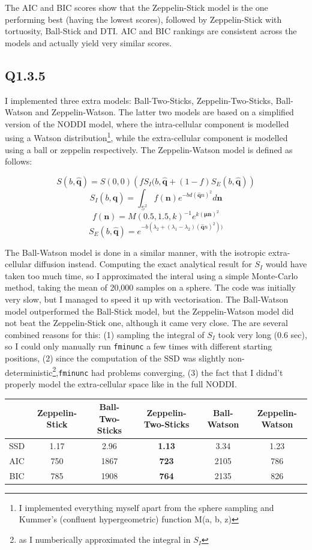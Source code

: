\documentclass[11pt,a4paper,oneside]{report}
\begin{document}
The AIC and BIC scores show that the Zeppelin-Stick model is the one performing best (having the lowest scores), followed by Zeppelin-Stick with tortuosity, Ball-Stick and DTI. AIC and BIC rankings are consistent across the models and actually yield very similar scores.


\subsection*{Q1.3.5}

I implemented three extra models: Ball-Two-Sticks, Zeppelin-Two-Sticks, Ball-Watson and Zeppelin-Watson. The latter two models are based on a simplified version of the NODDI model, where the intra-cellular component is modelled using a Watson distribution\footnote{I implemented everything myself apart from the sphere sampling and Kummer's (confluent hypergeometric) function M(a, b, z)}, while the extra-cellular component is modelled using a ball or zeppelin respectively. The Zeppelin-Watson model is defined as follows:

$$ S(b, \hat{\textbf{q}}) = S(0,0)\left(fS_I(b,\hat{\textbf{q}} + (1-f)S_E(b,\hat{\textbf{q}})\right)$$
$$S_I(b,\hat{\textbf{q}}) = \int_{\mathbb{S}^2}f(\textbf{n})e^{-bd(\hat{\textbf{q}} n)^2}d\textbf{n}$$
$$ f(\textbf{n}) = M(0.5, 1.5, k)^{-1} e^{k(\boldsymbol{\mu}\textbf{n})^2}$$
$$S_E(b,\hat{\textbf{q}}) = e^{-b(\lambda_2 + (\lambda_1 - \lambda_2)(\hat{\textbf{q}} n)^2))}$$

The Ball-Watson model is done in a similar manner, with the isotropic extra-cellular diffusion instead. Computing the exact analytical result for $S_I$ would have taken too much time, so I approximated the interal using a simple Monte-Carlo method, taking the mean of 20,000 samples on a sphere. The code was initially very slow, but I managed to speed it up with vectorisation. The Ball-Watson model outperformed the Ball-Stick model, but the Zeppelin-Watson model did not beat the Zeppelin-Stick one, although it came very close. The are several combined reasons for this: (1) sampling the integral of $S_I$ took very long (0.6 sec), so I could only manually run \texttt{fminunc} a few times with different starting positions, (2) since the computation of the SSD was slightly non-deterministic\footnote{as I numberically approximated the integral in $S_I$},\texttt{fminunc} had problems converging, (3) the fact that I didnd't properly model the extra-cellular space like in the full NODDI.

\begin{center}
 \begin{tabular}{c | c c c c c}
   & Zeppelin-Stick &  Ball-Two-Sticks & \textbf{Zeppelin-Two-Sticks} & Ball-Watson & Zeppelin-Watson\\
  \hline
  SSD & 1.17 & 2.96 & \textbf{1.13} & 3.34 & 1.23\\
  AIC & 750 & 1867 &  \textbf{723} & 2105 & 786\\
  BIC & 785 & 1908 &  \textbf{764} & 2135 & 826\\
  
 \end{tabular}

\end{center}
\end{document}

